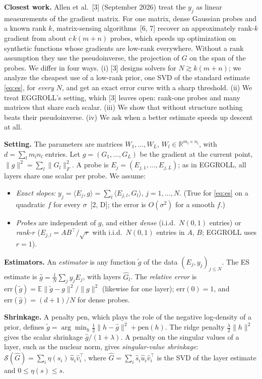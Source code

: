\documentclass[11pt]{article}
\newcommand{\R}{\mathbb{R}}
\newcommand{\E}{\mathbb{E}}
\newcommand{\ip}[2]{\langle #1,#2\rangle}
\newcommand{\Gh}{\widehat G}
\newcommand{\err}{\mathrm{err}}
\newcommand{\Sh}{\mathcal S}
\begin{document}
\textbf{Closest work.} Allen et al.~[3] (September 2026) treat the $y_j$ as linear measurements of the gradient matrix. For one matrix, dense Gaussian probes and a known rank $k$, matrix-sensing algorithms~[6, 7] recover an approximately rank-$k$ gradient from about $c\,k(m+n)$ probes, which speeds up optimization on synthetic functions whose gradients are low-rank everywhere. Without a rank assumption they use the pseudoinverse, the projection of $G$ on the span of the probes. We differ in four ways. (i) [3] designs solvers for $N\gtrsim k(m+n)$; we analyze the cheapest use of a low-rank prior, one SVD of the standard estimate \eqref{eq:es}, for \emph{every} $N$, and get an exact error curve with a sharp threshold. (ii) We treat EGGROLL's setting, which [3] leaves open: rank-one probes and many matrices that share each scalar. (iii) We show that without structure nothing beats their pseudoinverse. (iv) We ask when a better estimate speeds up descent at all.

\textbf{Setting.} The parameters are matrices $W_1,\dots,W_L$, $W_l\in\R^{m_l\times n_l}$, with $d=\sum_lm_ln_l$ entries. Let $g=(G_1,\dots,G_L)$ be the gradient at the current point, $\|g\|^2=\sum_l\|G_l\|_F^2$. A probe is $E_j=(E_{j,1},\dots,E_{j,L})$; as in EGGROLL, all layers share one scalar per probe. We assume:
\begin{itemize}[leftmargin=2.6em]
\item[(A1)] \emph{Exact slopes:} $y_j=\ip{E_j}{g}=\sum_l\ip{E_{j,l}}{G_l}$, $j=1,\dots,N$. (True for \eqref{eq:es} on a quadratic $f$ for every $\sigma$~[2, D]; the error is $O(\sigma^2)$ for a smooth $f$.)
\item[(A2)] \emph{Probes} are independent of $g$, and either \emph{dense} (i.i.d.\ $N(0,1)$ entries) or \emph{rank-$r$} ($E_{j,l}=AB^\top/\sqrt r$ with i.i.d.\ $N(0,1)$ entries in $A$, $B$; EGGROLL uses $r=1$).
\end{itemize}

\textbf{Estimators.} An \emph{estimator} is any function $\tilde g$ of the data $(E_j,y_j)_{j\le N}$. The ES estimate is $\hat g=\frac1N\sum_jy_jE_j$, with layers $\Gh_l$. The \emph{relative error} is $\err(\tilde g)=\E\|\tilde g-g\|^2/\|g\|^2$ (likewise for one layer); $\err(0)=1$, and $\err(\hat g)=(d+1)/N$ for dense probes.

\textbf{Shrinkage.} A penalty $\mathrm{pen}$, which plays the role of the negative log-density of a prior, defines $\tilde g=\arg\min_h\frac12\|h-\hat g\|^2+\mathrm{pen}(h)$. The ridge penalty $\frac\lambda2\|h\|^2$ gives the scalar shrinkage $\hat g/(1+\lambda)$. A penalty on the singular values of a layer, such as the nuclear norm, gives \emph{singular-value shrinkage}: $\Sh(\Gh)=\sum_i\eta(\hat s_i)\,\hat u_i\hat v_i^\top$, where $\Gh=\sum_i\hat s_i\hat u_i\hat v_i^\top$ is the SVD of the layer estimate and $0\le\eta(s)\le s$.
\end{document}
